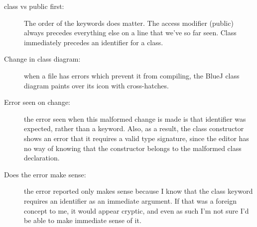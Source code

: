 \begin{description}
	\item [class vs public first:] The order of the keywords does
		matter. The access modifier (public) always precedes
		everything else on a line that we've so far seen. Class
		immediately precedes an identifier for a class.
	\item [Change in class diagram:] when a file has errors which
		prevent it from compiling, the BlueJ class diagram
		paints over its icon with cross-hatches.
	\item [Error seen on change:] the error seen when this malformed
		change is made is that identifier was expected, rather
		than a keyword. Also, as a result, the class constructor
		shows an error that it requires a valid type signature,
		since the editor has no way of knowing that the
		constructor belongs to the malformed class declaration.
	\item [Does the error make sense:] the error reported only makes
		sense because I know that the class keyword requires an
		identifier as an immediate argument. If that was a
		foreign concept to me, it would appear cryptic, and even
		as such I'm not sure I'd be able to make immediate sense
		of it.
\end{description}
